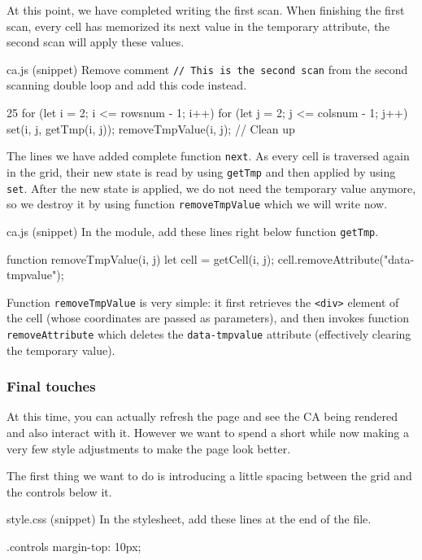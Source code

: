 At this point, we have completed writing the first scan. When finishing the first scan,
every cell has memorized its next value in the temporary attribute,
the second scan will apply these values.

\begin{programcode}{ca.js (snippet)}
Remove comment \texttt{// This is the second scan} from the second scanning double loop and add this
code instead.
\begin{codeh1}{2}{5}
for (let i = 2; i <= rowsnum - 1; i++) {
  for (let j = 2; j <= colsnum - 1; j++) {
    set(i, j, getTmp(i, j));
    removeTmpValue(i, j); // Clean up
  }
}
\end{codeh1}
\end{programcode}

The lines we have added complete function \texttt{next}. As every cell is traversed again in the grid,
their new state is read by using \texttt{getTmp} and then applied by using \texttt{set}. After the new
state is applied, we do not need the temporary value anymore, so we destroy it by using function
\texttt{removeTmpValue} which we will write now.

\begin{programcode}{ca.js (snippet)}
In the module, add these lines right below function \texttt{getTmp}.
\begin{code}
function removeTmpValue(i, j) {
  let cell = getCell(i, j);
  cell.removeAttribute("data-tmpvalue");
}
\end{code}
\end{programcode}

Function \texttt{removeTmpValue} is very simple: it first retrieves the \texttt{<div>} element of the cell
(whose coordinates are passed as parameters), and then invokes function \texttt{removeAttribute} which
deletes the \texttt{data-tmpvalue} attribute (effectively clearing the temporary value).

\subsubsection{Final touches}
At this time, you can actually refresh the page and see the CA being rendered and also interact with it.
However we want to spend a short while now making a very few style adjustments to make the page look better.

The first thing we want to do is introducing a little spacing between the grid and the controls below it.

\begin{programcode}{style.css (snippet)}
In the stylesheet, add these lines at the end of the file.
\begin{codecss}
.controls {
  margin-top: 10px;
}
\end{codecss}
\end{programcode}


